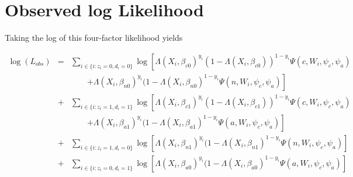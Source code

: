 \documentclass[12pt]{article}
\begin{document}

\section{Observed log Likelihood}

Taking the log of this four-factor likelihood yields

\begin{eqnarray*}
\log(L_{obs}) & = & \sum_{i \in \{i:z_i=0,d_i=0\}} \log \left[
\Lambda(X_i,\beta_{c0})^{y_i}
(1-\Lambda(X_i,\beta_{c0}))^{1-y_i}  \Psi(c, W_i,
\psi_c,\psi_a) \right. \\
& & \qquad \left. + \Lambda(X_i,\beta_{n0})^{y_i}
(1-\Lambda(X_i,\beta_{n0})^{1-y_i} \Psi(n, W_i,
\psi_c,\psi_a) \right] \\
& + & \sum_{i \in \{i:z_i=1,d_i=1\}} \log \left[
\Lambda(X_i,\beta_{c1})^{y_i}
(1-\Lambda(X_i,\beta_{c1}))^{1-y_i}  \Psi(c, W_i,
\psi_c,\psi_a) \right. \\
& & \qquad \left. + \Lambda(X_i,\beta_{a1})^{y_i}
(1-\Lambda(X_i,\beta_{a1})^{1-y_i} \Psi(a, W_i,
\psi_c,\psi_a) \right] \\
& + & \sum_{i \in \{i:z_i=1,d_i=0\}} \log \left[ \Lambda(X_i,\beta_{n1})^{y_i}
(1-\Lambda(X_i,\beta_{n1})^{1-y_i} \Psi(n, W_i,
\psi_c,\psi_a) \right] \\
& + & \sum_{i \in \{i:z_i=0,d_i=1\}} \log \left[ \Lambda(X_i,\beta_{a0})^{y_i}
(1-\Lambda(X_i,\beta_{a0})^{1-y_i} \Psi(a, W_i,
\psi_c,\psi_a) \right] 
\end{eqnarray*}
\end{document}
